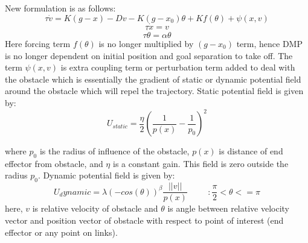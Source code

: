 \newline
New formulation is as follows:
\begin{equation}
	\tau \dot{v} = K(g - x) - Dv - K(g - x_{0})\theta + Kf(\theta) + \psi(x, v)
\end{equation}
\begin{equation}
	\tau \dot{x} = v 
\end{equation}
\begin{equation}
	\tau \dot{\theta} = \alpha \theta 
\end{equation}
Here forcing term $f(\theta)$ is no longer multiplied by $(g - x_{0})$ term, hence DMP is no longer dependent on initial position and goal separation to take off. The term $\psi(x, v)$ is extra coupling term or perturbation term added to deal with the obstacle which is essentially the gradient of static or dynamic potential field around the obstacle which will repel the trajectory. 
\newline
Static potential field is given by:
\begin{equation}
	U_{static} = \frac{\eta}{2}(\frac{1}{p(x)} - \frac{1}{p_{0}})^{2}
\end{equation}

where $p_{0}$ is the radius of influence of the obstacle, $p(x)$ is distance of end effector from obstacle, and $\eta$ is a constant gain. This field is zero outside the radius $p_{0}$.
\newline
Dynamic potential field is given by:
\begin{equation}
	U_dynamic = \lambda(-cos(\theta))^{\beta}\frac{||v||}{p(x)} \hspace{1cm} : \frac{\pi}{2} < \theta <= \pi
\end{equation}
here, $v$ is relative velocity of obstacle and $\theta$ is angle between relative velocity vector and position vector of obstacle with respect to point of interest (end effector or any point on links). 

